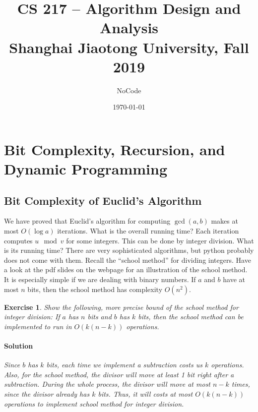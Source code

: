 \documentclass[12pt,a4]{article}
\newtheorem{exercise}[theorem]{Exercise}
\begin{document}
\author{NoCode}
\date{\today}

\title{CS 217 -- Algorithm Design and Analysis \\ 
  \vspace{3mm}
{\large	Shanghai Jiaotong University, Fall 2019\\
}
}
\maketitle

\noindent


\section{Bit Complexity, Recursion, and Dynamic Programming}

\subsection{Bit Complexity of Euclid's Algorithm}

We have proved that Euclid's algorithm for computing $\gcd(a,b)$ makes at most
$O(\log a)$ iterations. What is the overall running time? Each iteration computes
$u \mod v$ for some integers. This can be done by integer division. What is its running time?
There are very sophisticated algorithms, but python probably does not come with them. 
Recall the ``school method'' for dividing integers. Have a look at the pdf slides on the 
webpage for an illustration of the school method. It is especially simple if we are dealing
with binary numbers. If $a$ and $b$ have at most $n$ bits, then the school method 
has complexity $O(n^2)$.
\begin{exercise}
  Show the following, more precise bound of the school method for integer division:
  If $a$ has $n$ bits and $b$ has $k$ bits, then the school method can be implemented
  to run in $O( k(n-k))$ operations.
  
\paragraph{Solution} Since $b$ has $k$ bits, each time we implement a subtraction costs us $k$ operations. 
Also, for the school method, the divisor will move at least 1 bit right after a subtraction. 
During the whole process, the divisor will move at most $n-k$ times, since the divisor already has $k$ bits. 
Thus, it will costs at most $O(k(n-k))$ operations to implement school method for integer division. 
  
\end{exercise}
\end{document}
